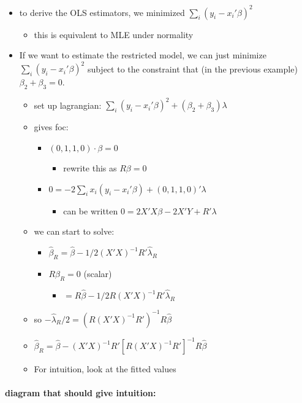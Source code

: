 \begin{itemize}
\item to derive the OLS estimators, we minimized $\sum_i (y_i -
      x_i'\beta)^2$
\begin{itemize}
\item this is equivalent to MLE under normality
\end{itemize}
\item If we want to estimate the restricted model, we can just minimize
      $\sum_i (y_i - x_i'\beta)^2$ subject to the constraint that (in
      the previous example) $\beta_2 + \beta_3 = 0$.
\begin{itemize}
\item set up lagrangian: $\sum_i (y_i - x_i'\beta)^2 + (\beta_2 + \beta_3)\lambda$
\item gives foc:
\begin{itemize}
\item $(0, 1, 1, 0) \cdot \beta = 0$
\begin{itemize}
\item rewrite this as $R\beta = 0$
\end{itemize}
\item $0 = - 2 \sum_i x_i (y_i - x_i'\beta) + (0, 1, 1, 0)' \lambda$
\begin{itemize}
\item can be written $0 = 2 X'X\beta - 2 X'Y + R' \lambda$
\end{itemize}
\end{itemize}
\item we can start to solve:
\begin{itemize}
\item $\hat\beta_R = \hat\beta - 1/2 (X'X)^{-1} R' \hat\lambda_R$
\item $R \hat\beta_R = 0$ (scalar)
\begin{itemize}
\item $= R \hat\beta - 1/2 R (X'X)^{-1} R' \hat\lambda_R$
\end{itemize}
\end{itemize}
\item so $- \hat\lambda_R/2 = (R (X'X)^{-1} R')^{-1} R\hat\beta$
\item $\hat\beta_R = \hat\beta - (X'X)^{-1} R' [R(X'X)^{-1}R']^{-1} R\hat\beta$
\item For intuition, look at the fitted values
\end{itemize}
\end{itemize}

\paragraph{diagram that should give intuition:}

